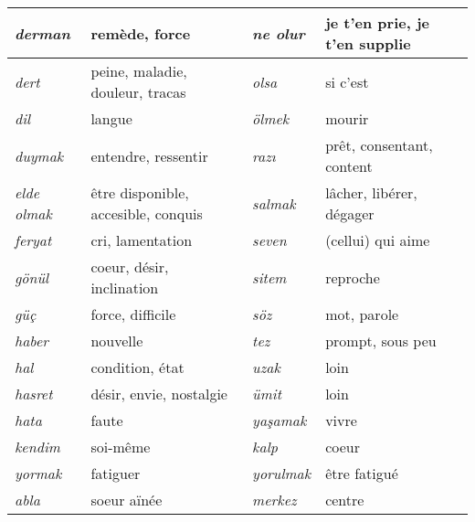 \documentclass{cours}
\newcommand{\ch}{\c{s}}
\begin{document}
\begin{longtable}{>{\sl}p{}p{}|>{\sl}p{}p{}}
    derman           & remède, force                                        & ne olur         & je t'en prie, je t'en supplie    \\
    \midrule
    dert             & peine, maladie, douleur, tracas                      & olsa            & si c'est                         \\
    \midrule
    dil              & langue                                               & ölmek           & mourir                           \\
    \midrule
    duymak           & entendre, ressentir                                  & raz\i           & prêt, consentant, content        \\
    \midrule
    elde olmak       & être disponible, accesible, conquis                  & salmak          & lâcher, libérer, dégager         \\
    \midrule
    feryat           & cri, lamentation                                     & seven           & (cellui) qui aime                \\
    \midrule
    gönül            & coeur, désir, inclination                            & sitem           & reproche                         \\
    \midrule
    güç              & force, difficile                                     & söz             & mot, parole                      \\
    \midrule
    haber            & nouvelle                                             & tez             & prompt, sous peu                 \\
    \midrule
    hal              & condition, état                                      & uzak            & loin                             \\
    \midrule
    hasret           & désir, envie, nostalgie                              & ümit            & loin                             \\
    \midrule
    hata             & faute                                                & ya\ch amak      & vivre                            \\
    \midrule
    kendim           & soi-même                                             & kalp            & coeur                            \\
    \midrule
    yormak           & fatiguer                                             & yorulmak        & être fatigué                     \\
    \midrule
    abla             & soeur aïnée                                          & merkez          & centre                           \\

\end{longtable}
\end{document}

